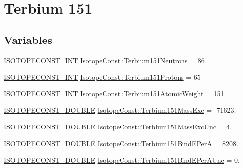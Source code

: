 \hypertarget{group___isotope_const-_terbium-_tb151}{}\section{Terbium 151}
\label{group___isotope_const-_terbium-_tb151}
\subsection*{Variables}
\begin{DoxyCompactItemize}
\item 
\mbox{\hyperlink{group___isotope_const-_macros_ga5f18360b3e99483a35c32d789e62621c}{I\+S\+O\+T\+O\+P\+E\+C\+O\+N\+S\+T\+\_\+\+I\+NT}} \mbox{\hyperlink{group___isotope_const-_terbium-_tb151_ga7ed3b43afc5e3ffc744f70fa6ffbd98b}{Isotope\+Const\+::\+Terbium151\+Neutrons}} = 86
\item 
\mbox{\hyperlink{group___isotope_const-_macros_ga5f18360b3e99483a35c32d789e62621c}{I\+S\+O\+T\+O\+P\+E\+C\+O\+N\+S\+T\+\_\+\+I\+NT}} \mbox{\hyperlink{group___isotope_const-_terbium-_tb151_ga0c5f8e01024fb2f6fb5b59c03bc5f11c}{Isotope\+Const\+::\+Terbium151\+Protons}} = 65
\item 
\mbox{\hyperlink{group___isotope_const-_macros_ga5f18360b3e99483a35c32d789e62621c}{I\+S\+O\+T\+O\+P\+E\+C\+O\+N\+S\+T\+\_\+\+I\+NT}} \mbox{\hyperlink{group___isotope_const-_terbium-_tb151_ga727c99bcece1ee69cb6056fc2434ac6f}{Isotope\+Const\+::\+Terbium151\+Atomic\+Weight}} = 151
\item 
\mbox{\hyperlink{group___isotope_const-_macros_ga8f45a7272ce02c0b4c65c44636ed719a}{I\+S\+O\+T\+O\+P\+E\+C\+O\+N\+S\+T\+\_\+\+D\+O\+U\+B\+LE}} \mbox{\hyperlink{group___isotope_const-_terbium-_tb151_ga4b09206bcddcd815f5763b371868f1a6}{Isotope\+Const\+::\+Terbium151\+Mass\+Exc}} = -\/71623.
\item 
\mbox{\hyperlink{group___isotope_const-_macros_ga8f45a7272ce02c0b4c65c44636ed719a}{I\+S\+O\+T\+O\+P\+E\+C\+O\+N\+S\+T\+\_\+\+D\+O\+U\+B\+LE}} \mbox{\hyperlink{group___isotope_const-_terbium-_tb151_ga839051389a3449ba71e7ec9b31168f3d}{Isotope\+Const\+::\+Terbium151\+Mass\+Exc\+Unc}} = 4.
\item 
\mbox{\hyperlink{group___isotope_const-_macros_ga8f45a7272ce02c0b4c65c44636ed719a}{I\+S\+O\+T\+O\+P\+E\+C\+O\+N\+S\+T\+\_\+\+D\+O\+U\+B\+LE}} \mbox{\hyperlink{group___isotope_const-_terbium-_tb151_ga8273639685e5c1fe7154f1833147f99f}{Isotope\+Const\+::\+Terbium151\+Bind\+E\+PerA}} = 8208.
\item 
\mbox{\hyperlink{group___isotope_const-_macros_ga8f45a7272ce02c0b4c65c44636ed719a}{I\+S\+O\+T\+O\+P\+E\+C\+O\+N\+S\+T\+\_\+\+D\+O\+U\+B\+LE}} \mbox{\hyperlink{group___isotope_const-_terbium-_tb151_ga7e7e8564f1b29a7bf218d77202f49897}{Isotope\+Const\+::\+Terbium151\+Bind\+E\+Per\+A\+Unc}} = 0.

\end{DoxyCompactItemize}
